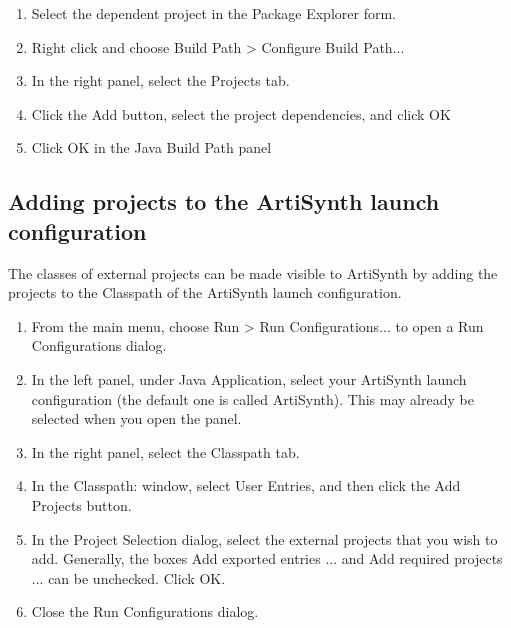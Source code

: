 \begin{enumerate}

\item Select the dependent project in the {\sf Package Explorer} form.

\item Right click and choose {\sf Build Path > Configure Build Path...} 

\item In the right panel, select the {\sf Projects} tab.

\item Click the {\sf Add} button, select the project dependencies,
      and click {\sf OK}

\item Click {\sf OK} in the Java Build Path panel

\end{enumerate}

\subsection{Adding projects to the ArtiSynth launch configuration}
\label{AddingProjectsToLaunch}

The classes of external projects can be made visible to ArtiSynth by
adding the projects to the Classpath of the ArtiSynth launch
configuration.

\begin{enumerate}

\item From the main menu, choose {\sf Run > Run Configurations...}
to open a {\sf Run Configurations} dialog.

\item In the left panel, under {\sf Java Application}, select your
ArtiSynth launch configuration (the default one is called {\sf
ArtiSynth}). This may already be selected when you open the panel.

\item In the right panel, select the {\sf Classpath} tab.

\item In the {\sf Classpath:} window, select {\sf User Entries},
and then click the {\sf Add Projects} button.

\item In the {\sf Project Selection} dialog, select the external
projects that you wish to add. Generally, the boxes
{\sf Add exported entries ...} and {\sf Add required projects ...}
can be unchecked. Click {\sf OK}.

\item Close the {\sf Run Configurations} dialog.

\end{enumerate}

